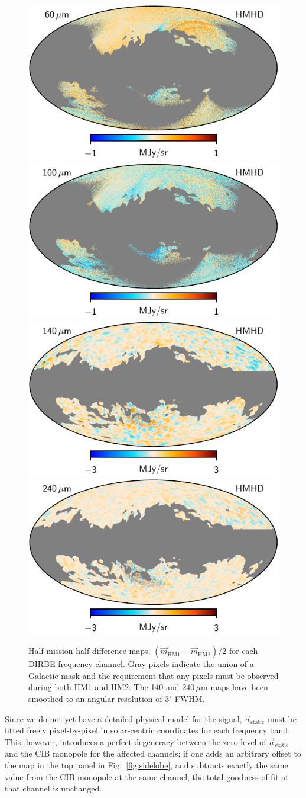 \documentclass{aa}
\renewcommand{\a}[0]{\vec{a}}
\newcommand{\m}[0]{\vec{m}}
\begin{document}
\begin{figure}
  \includegraphics[width=0.42\linewidth]{figs/dirbe_07_hmhd_v1.pdf}\hspace*{5mm}
  \includegraphics[width=0.42\linewidth]{figs/dirbe_08_hmhd_v1.pdf}\\
  \includegraphics[width=0.42\linewidth]{figs/dirbe_09_hmhd_v1_3deg.pdf}\hspace*{5mm}
  \includegraphics[width=0.42\linewidth]{figs/dirbe_10_hmhd_v1_3deg.pdf}
  \caption{Half-mission half-difference maps, $(\m_{\mathrm{HM1}}-\m_{\mathrm{HM2}})/2$ for each DIRBE frequency channel. Gray pixels indicate the union of a Galactic mask and the requirement that any pixels must be observed during both HM1 and HM2. The 140 and 240\,$\mu\mathrm{m}$ maps have been smoothed to an angular resolution of $3^{\circ}$ FWHM.}
  \label{fig:hmhd}
\end{figure}



Since we do not yet have a detailed physical model for the signal,
$\a_{\mathrm{static}}$ must be fitted freely pixel-by-pixel in
solar-centric coordinates for each frequency band. This, however,
introduces a perfect degeneracy between the zero-level of
$\a_{\mathrm{static}}$ and the CIB monopole for the affected channels;
if one adds an arbitrary offset to the map in the top panel in
Fig.~\ref{fig:sidelobe}, and subtracts exactly the same value from the
CIB monopole at the same channel, the total goodness-of-fit at that
channel is unchanged.
\end{document}
